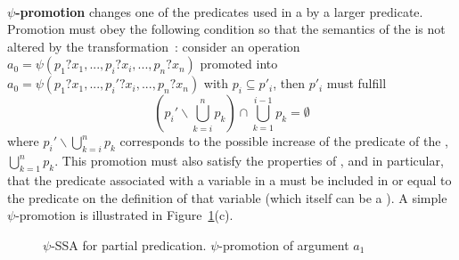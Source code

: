 ~\\
\textbf{$\psi$-promotion} changes one of the predicates used in a
  \psifun by a larger predicate. 
 Promotion must obey the following condition so that the semantics of the \psifun 
 is not altered by the transformation~: consider an operation $ a_0 = \psi(p_1?x_1, ..., p_i?x_i, ..., p_n?x_n)$
promoted into $ a_0 = \psi(p_1?x_1, ..., p_i'?x_i, ..., p_n?x_n)$ with $p_i\subseteq p'_i$, then $p'_i$ must fulfill 
\begin{equation}
\left(p_i' \backslash \bigcup_{k=i}^n p_k\right) \cap \bigcup_{k=1}^{i-1} p_k=\emptyset \label{eq:psi_ssa:prom}
\end{equation}
where $p_i' \backslash \bigcup_{k=i}^n p_k$ corresponds to the possible increase of the predicate of the \psifun, $\bigcup_{k=1}^{n} p_k$. 
This promotion must also satisfy the properties of \psifuns, and in particular, that the predicate associated with a
variable in a \psifun must be included in or equal to the
predicate on the definition of that variable (which itself can be a \psifun). A simple $\psi$-promotion is illustrated in Figure~\ref{fig:psi_partial}(c). 
\begin{figure}[h]
\begin{center}
\footnotesize
\hfill
{} \hfill
{}\hfill
{}
\caption{$\psi$-SSA for partial predication. $\psi$-promotion of argument $a_1$}
\label{fig:psi_partial}
\end{center}
\end{figure}

